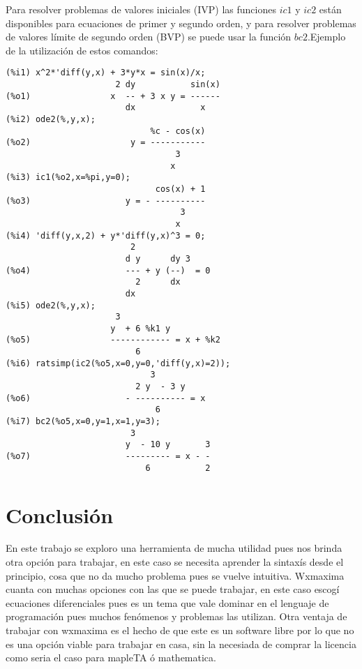 \documentclass{article}
\begin{document}
\newline
Para resolver problemas de valores iniciales (IVP) las funciones $ic1$ y $ic2$ están disponibles para ecuaciones de primer y segundo orden, y para resolver problemas de valores límite de segundo orden (BVP) se puede usar la función $bc2$.Ejemplo de la utilización de estos comandos:
\begin{verbatim}
(%i1) x^2*'diff(y,x) + 3*y*x = sin(x)/x;
                      2 dy           sin(x)
(%o1)                x  -- + 3 x y = ------
                        dx             x
(%i2) ode2(%,y,x);
                             %c - cos(x)
(%o2)                    y = -----------
                                  3
                                 x
(%i3) ic1(%o2,x=%pi,y=0);
                              cos(x) + 1
(%o3)                   y = - ----------
                                   3
                                  x
(%i4) 'diff(y,x,2) + y*'diff(y,x)^3 = 0;
                         2
                        d y      dy 3
(%o4)                   --- + y (--)  = 0
                          2      dx
                        dx
(%i5) ode2(%,y,x);
                      3
                     y  + 6 %k1 y
(%o5)                ------------ = x + %k2
                          6
(%i6) ratsimp(ic2(%o5,x=0,y=0,'diff(y,x)=2));
                             3
                          2 y  - 3 y
(%o6)                   - ---------- = x
                              6
(%i7) bc2(%o5,x=0,y=1,x=1,y=3);
                         3
                        y  - 10 y       3
(%o7)                   --------- = x - -
                            6           2
\end{verbatim}

\section{Conclusión}
En este trabajo se exploro una herramienta de mucha utilidad pues nos brinda otra opción para trabajar, en este caso se necesita aprender la sintaxís desde el principio, cosa que no da mucho problema pues se vuelve intuitiva. Wxmaxima cuanta con muchas opciones con las que se puede trabajar, en este caso escogí ecuaciones diferenciales pues es un tema que vale dominar en el lenguaje de programación pues muchos fenómenos y problemas las utilizan.
\newline
Otra ventaja de trabajar con wxmaxima es el hecho de que este es un software libre por lo que no es una opción viable para trabajar en casa, sin la necesiada de comprar la licencia como seria el caso para mapleTA ó mathematica.
\end{document}
